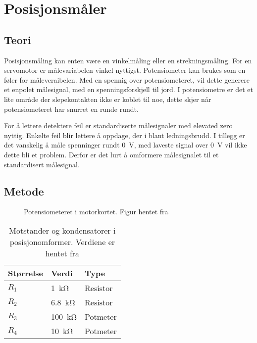 \section{Posisjonsmåler}
\label{sec:pos_måler}

\subsection{Teori}




Posisjonsmåling kan enten være en vinkelmåling eller en strekningsmåling. For en servomotor er målevariabelen vinkel nyttigst. Potensiometer kan brukes som en føler for måleveraibelen. Med en spennig over potensiometeret, vil dette generere et enpolet målesignal, med en spenningsforskjell til jord. I potensiometre er det et lite område der slepekontakten ikke er koblet til noe, dette skjer når potensiometeret har snurret en runde rundt.


For å lettere detektere feil er standardiserte målesignaler med elevated zero nyttig. Enkelte feil blir lettere å oppdage, der i blant ledningsbrudd. I tillegg er det vanskelig å måle spenninger rundt \SI{0}{\volt}, med laveste signal over \SI{0}{\volt} vil ikke dette bli et problem. Derfor er det lurt å omformere målesignalet til et standardisert målesignal.






\subsection{Metode}

\begin{figure}[h]
    \centering
    
    \caption{Potensiometeret i motorkortet. Figur hentet fra \cite{AnalogMotorlabbOppgaver}}
    \label{fig:posisjon_maler_potmeter}
\end{figure}

\begin{table}[h]
    \centering
    \caption{Motstander og kondensatorer i posisjonomformer. Verdiene er hentet fra \cite{AnalogMotorlabbOppgaver}}
    \begin{tabular}{lll}
        \toprule
        Størrelse & Verdi & Type \\
		\midrule
        $R_1$ & \SI{1}{\kilo\ohm} & Resistor\\
        $R_2$ & \SI{6.8}{\kilo\ohm} & Resistor \\
        $R_3$ & \SI{100}{\kilo\ohm} & Potmeter \\
        $R_4$ & \SI{10}{\kilo\ohm} & Potmeter \\
        \bottomrule
    \end{tabular}
    \label{tab:Komponenter_i_posisjonsmaler}
\end{table}


